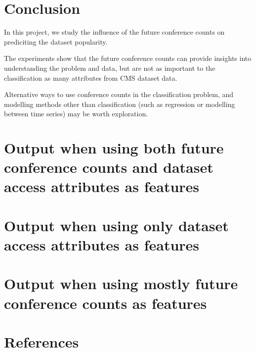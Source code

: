 \documentclass[final, 12pt]{elsarticle}
\begin{document}
\section{Conclusion}

In this project, we study the influence of the future conference counts on prediciting the dataset popularity.

The experiments show that the future conference counts can provide insights into understanding the problem and data,
but are not as important to the classification as many attributes from CMS dataset data.

Alternative ways to use conference counts in the classification problem, and modelling methods other than classification (such as regression or modelling between time series) may be worth exploration.



\appendix

\section{Output when using both future conference counts and dataset access attributes as features}
\label{app1}


\section{Output when using only dataset access attributes as features}
\label{app2}


\section{Output when using mostly future conference counts as features}
\label{app3}





\section*{References}








\end{document}
